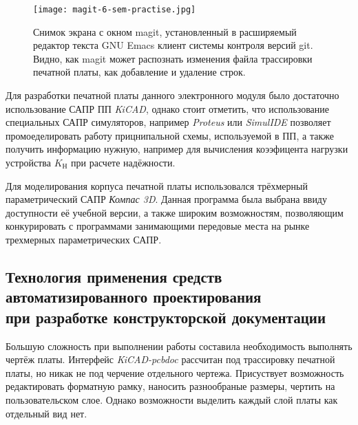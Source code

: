 \begin{figure}[H]
  \centering
  \texttt{[image: magit-6-sem-practise.jpg]}
  \caption{Снимок экрана с окном magit,
    установленный в расширяемый редактор текста GNU Emacs
    клиент системы контроля версий git.
    Видно, как magit может распознать изменения файла трассировки печатной платы,
    как добавление и удаление строк.}
\end{figure}

Для разработки печатной платы данного электронного модуля было
достаточно использование САПР ПП \textit{KiCAD}, однако стоит
отметить, что использование специальных САПР симуляторов,
например \textit{Proteus} или \textit{SimulIDE}
позволяет промоеделировать работу прицнипальной схемы,
используемой в ПП, а также получить информацию
нужную, например для вычисления коээфицента нагрузки устройства
$K_{\textrm{Н}}$ при расчете надёжности.

Для моделирования корпуса печатной платы использовался
трёхмерный параметрический САПР \textit{Компас 3D}.
Данная программа была выбрана ввиду доступности
её учебной версии, а также широким возможностям,
позволяющим конкурировать с программами
занимающими передовые места на рынке
трехмерных параметрических САПР.


\subsection{Технология применения средств автоматизированного проектирования \\
  при разработке конструкторской документации}

Большую сложность при выполнении работы составила необходимость
выполнять чертёж платы.
Интерфейс \textit{KiCAD-pcbdoc} рассчитан под трассировку печатной
платы, но никак не под черчение отдельного чертежа.
Присуствует возможность редактировать форматную рамку, наносить
разнообраные размеры, чертить на пользовательском слое.
Однако возможности выделить
каждый слой платы как отдельный вид нет.


